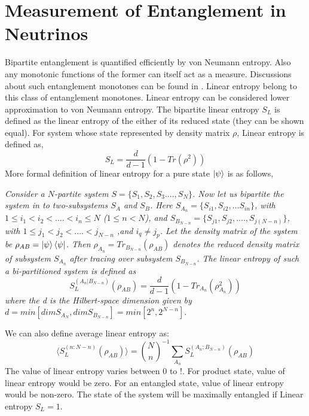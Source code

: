 \documentclass[12pt,a4paper]{report}
\begin{document}
\section{Measurement of Entanglement in Neutrinos}
Bipartite entanglement is quantified efficiently by von Neumann entropy. Also any monotonic functions of the former can itself act as a measure. Discussions about such entanglement monotones can be found in \cite{horodecki}\cite{amico}. Linear entropy belong to this class of entanglement monotones. Linear entropy can be considered lower approximation to von Neumann entropy. The bipartite linear entropy $S_{L}$ is defined as the linear entropy of the either of its reduced state (they can be shown equal). For system whose state represented by density matrix $\rho$, Linear entropy is defined as,
\begin{equation}
S_{L} = \frac{d}{d-1}(1-Tr(\rho^{2}))
\end{equation}
More formal definition of linear entropy for a pure state $\ket{\psi}$ is as follows,\par
\emph{Consider a $N$-partite system $S=\{S_{1},S_{2},S_{3}....,S_{N}\}$. Now let us bipartite the system in to two-subsystems $S_{A}$ and $S_{B}$. Here $S_{A_{n}}=\{S_{i1},S_{i2},...S_{in}\}$, with $1\leq i_{1}<i_{2}<....<i_{n}\leq N$ ($1 \leq n < N$), and $S_{B_{N-n}} =\{S_{j1},S_{j2},....,S_{j(N-n)}\}$, with $1\leq j_{1}< j_{2} < ....<j_{N-n}$ ,and $i_{q} \neq j_{p}$. Let the density matrix of the system be $\rho_{AB}=\ket{\psi}\bra{\psi}$. Then $\rho_{A_{n}}= Tr_{B_{N-n}}(\rho_{AB})$ denotes the reduced density matrix of subsystem $S_{A_{n}}$ after tracing over subsystem $S_{B_{N-n}}$. The linear entropy of such a bi-partitioned system is defined as
\begin{equation}
\label{eq:25}
    S_{L}^{(A_{n}|B_{N-n})} (\rho_{AB}) = \frac{d}{d-1}\left(1-Tr_{A_{n}}(\rho_{A_{n}}^{2})\right)
\end{equation}
where the d is the Hilbert-space dimension given by $d=min[dim S_{A_{N}},dim S_{B_{N-n}}]= min[2^{n},2^{N-n}]$}\cite{blasone2009}.\par

We can also define average linear entropy as:
\begin{equation}
\langle S_{L}^{(n:N-n)}(\rho_{AB})\rangle= \binom{N}{n}^{-1} \sum_{A_{n}} S_{L}^{(A_{n};B_{N-n})}(\rho_{AB})
\end{equation}
The value of linear entropy varies between $0$ to $!$. For product state, value of linear entropy would be zero. For an entangled state, value of linear entropy would be non-zero. The state of the system will be maximally entangled if Linear entropy $S_{L}=1$.
\end{document}
